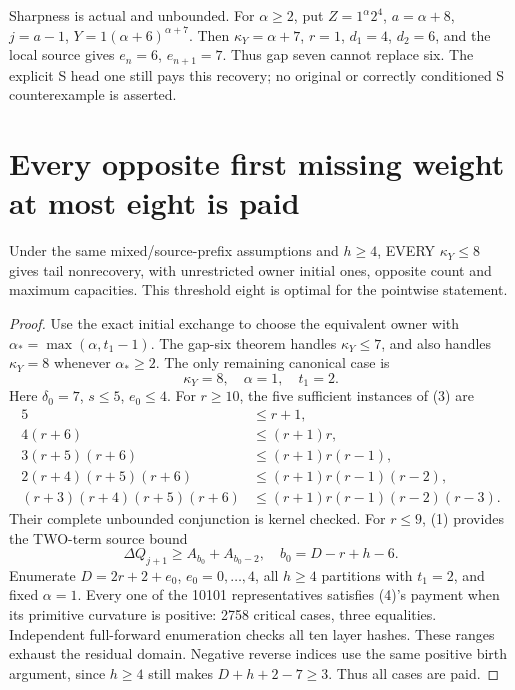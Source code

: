 Sharpness is actual and unbounded. For $\alpha\ge2$, put
$Z=1^\alpha2^4$, $a=\alpha+8$, $j=a-1$,
$Y=1(\alpha+6)^{\alpha+7}$. Then $\kappa_Y=\alpha+7$,
$r=1$, $d_1=4$, $d_2=6$, and the local source gives
$e_n=6$, $e_{n+1}=7$. Thus gap seven cannot replace six.
The explicit S head one still pays this recovery; no original
or correctly conditioned S counterexample is asserted.

\section{Every opposite first missing weight at most eight is paid}
\begin{theorem}
Under the same mixed/source-prefix assumptions and $h\ge4$,
EVERY $\kappa_Y\le8$ gives tail nonrecovery, with unrestricted
owner initial ones, opposite count and maximum capacities.
This threshold eight is optimal for the pointwise statement.
\end{theorem}
\begin{proof}
Use the exact initial exchange to choose the equivalent owner
with $\alpha_* =\max(\alpha,t_1-1)$.
The gap-six theorem handles $\kappa_Y\le7$, and also handles
$\kappa_Y=8$ whenever $\alpha_*\ge2$.
The only remaining canonical case is
\[
                    \kappa_Y=8,\quad\alpha=1,\quad t_1=2.
\]
Here $\delta_0=7$, $s\le5$, $e_0\le4$.
For $r\ge10$, the five sufficient instances of (3) are
\[
\begin{split}
5&\le r+1,\\
4(r+6)&\le(r+1)r,\\
3(r+5)(r+6)&\le(r+1)r(r-1),\\
2(r+4)(r+5)(r+6)&\le(r+1)r(r-1)(r-2),\\
(r+3)(r+4)(r+5)(r+6)&\le(r+1)r(r-1)(r-2)(r-3).
\end{split}
\]
Their complete unbounded conjunction is kernel checked.
For $r\le9$, (1) provides the TWO-term source bound
\[
              \Delta Q_{j+1}\ge A_{b_0}+A_{b_0-2},
                         \quad b_0=D-r+h-6.           \tag{4}
\]
Enumerate $D=2r+2+e_0$, $e_0=0,\ldots,4$, all $h\ge4$
partitions with $t_1=2$, and fixed $\alpha=1$.
Every one of the 10101 representatives satisfies (4)'s payment
when its primitive curvature is positive: 2758 critical cases,
three equalities. Independent full-forward enumeration checks
all ten layer hashes. These ranges exhaust the residual domain.
Negative reverse indices use the same positive birth argument,
since $h\ge4$ still makes $D+h+2-7\ge3$.
Thus all cases are paid.
\end{proof}

